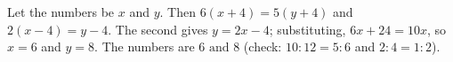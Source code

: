 Let the numbers be $x$ and $y$. Then $6(x+4)=5(y+4)$ and $2(x-4)=y-4$. The second gives $y=2x-4$; substituting, $6x+24=10x$, so $x=6$ and $y=8$. The numbers are $\boxed{6\text{ and }8}$ (check: $10:12=5:6$ and $2:4=1:2$).

